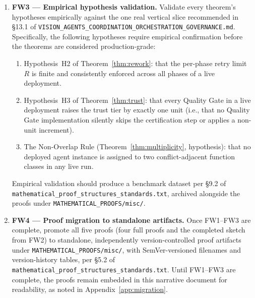 \documentclass[12pt]{article}
\theoremstyle{definition}
\newcommand{\code}[1]{\texttt{#1}}
\newcommand{\VisionGov}{\code{VISION\_AGENTS\_\allowbreak COORDINATION\_\allowbreak ORCHESTRATION\_\allowbreak GOVERNANCE.md}}
\newcommand{\ProofStd}{\code{mathematical\_proof\_\allowbreak structures\_standards.txt}}
\begin{document}
\begin{enumerate}
    \item \textbf{FW3 --- Empirical hypothesis validation.}
          Validate every theorem's hypotheses empirically against the
          one real vertical slice recommended in \S13.1 of \VisionGov{}.
          Specifically, the following hypotheses require empirical
          confirmation before the theorems are considered production-grade:
          \begin{enumerate}
              \item[FW3a.] Hypothesis~H2 of Theorem~\ref{thm:rework}:
                    that the per-phase retry limit $R$ is finite and
                    consistently enforced across all phases of a live
                    deployment.
              \item[FW3b.] Hypothesis~H3 of Theorem~\ref{thm:trust}:
                    that every Quality Gate in a live deployment raises
                    the trust tier by exactly one unit (i.e., that no
                    Quality Gate implementation silently skips the
                    certification step or applies a non-unit increment).
              \item[FW3c.] The Non-Overlap Rule
                    (Theorem~\ref{thm:multiplicity}, hypothesis):
                    that no deployed agent instance is
                    assigned to two conflict-adjacent function classes
                    in any live run.
          \end{enumerate}
          Empirical validation should produce a benchmark dataset
          per \S9.2 of \ProofStd{}, archived alongside the proofs
          under \code{MATHEMATICAL\_\allowbreak PROOFS/misc/}.

    \item \textbf{FW4 --- Proof migration to standalone artifacts.}
          Once FW1--FW3 are complete, promote all five proofs
          (four full proofs and the completed sketch from FW2) to
          standalone, independently version-controlled proof artifacts
          under \code{MATHEMATICAL\_\allowbreak PROOFS/misc/}, with
          SemVer-versioned filenames and version-history tables, per
          \S5.2 of \ProofStd{}.  Until FW1--FW3 are complete, the
          proofs remain embedded in this narrative document for
          readability, as noted in Appendix~\ref{app:migration}.


\end{enumerate}
\end{document}
